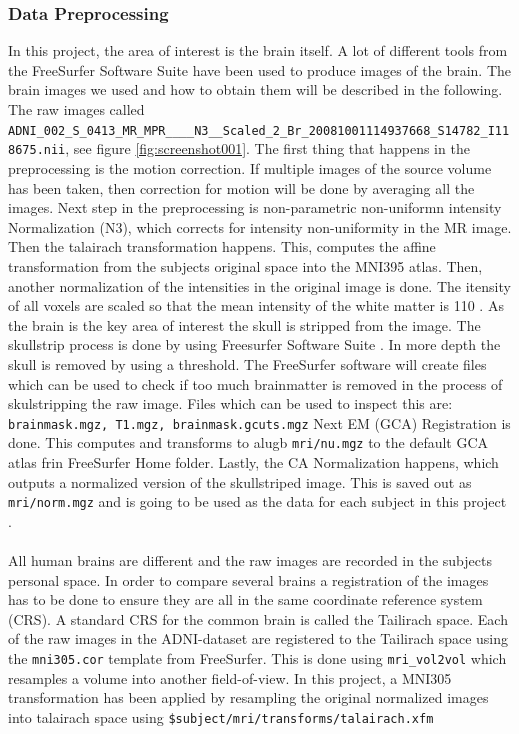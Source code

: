 \documentclass[12pt, fleqn, titlepage]{article}
\begin{document}
\subsubsection{Data Preprocessing}

In this project, the area of interest is the brain itself. A lot of different tools from the FreeSurfer Software Suite have been used to produce images of the brain. The brain images we used and how to obtain them will be described in the following. The raw images called \newline \texttt{
ADNI\_002\_S\_0413\_MR\_MPR\_\_\_\_N3\_\_Scaled\_2\_Br\_20081001114937668\_S14782\_I118675.nii}, see figure \ref{fig:screenshot001}. The first thing that happens in the preprocessing is the motion correction. If multiple images of the source volume has been taken, then correction for motion will be done by averaging all the images.
Next step in the preprocessing is non-parametric non-uniformn intensity Normalization (N3), which corrects for intensity non-uniformity in the MR image.
Then the talairach transformation happens. This, computes the affine transformation from the subjects original space into the MNI395 atlas.
Then, another normalization of the intensities in the original image is done. The itensity of all voxels are scaled so that the mean intensity of the white matter is 110 \cite{normalize}. 
As the brain is the key area of interest the skull is stripped from the image. The skullstrip process is done by using Freesurfer Software Suite \cite{freesurfer}.
In more depth the skull is removed by using a threshold.
The FreeSurfer software will create files which can be used to check if too much brainmatter is removed in the process of skulstripping the raw image.
Files which can be used to inspect this are: \texttt{brainmask.mgz, T1.mgz, brainmask.gcuts.mgz}
Next EM (GCA) Registration is done. This computes and transforms to alugb \texttt{mri/nu.mgz} to the default GCA atlas frin FreeSurfer Home folder. Lastly, the CA Normalization happens, which outputs a normalized version of the skullstriped image. This is saved out as \texttt{mri/norm.mgz} and is going to be used as the data for each subject in this project \cite{reckon}.
\\\\
All human brains are different and the raw images are recorded in the subjects personal space. 
In order to compare several brains a registration of the images has to be done to ensure they are all in the same coordinate reference system (CRS). 
A standard CRS for the common brain is called the Tailirach space. 
Each of the raw images in the ADNI-dataset are registered to the Tailirach space using the \texttt{mni305.cor} template from FreeSurfer. 
This is done using \texttt{mri\_vol2vol} which resamples a volume into another field-of-view. 
In this project, a MNI305 transformation has been applied by resampling the original normalized images into talairach space using \texttt{\$subject/mri/transforms/talairach.xfm} %
\end{document}
